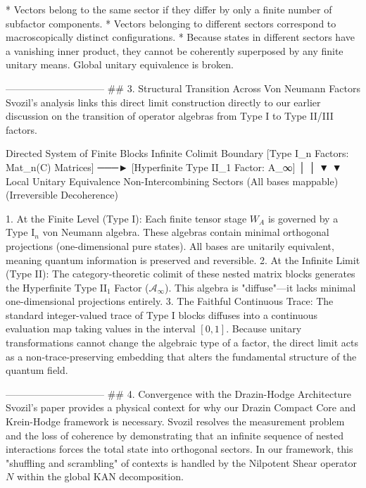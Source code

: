 * Vectors belong to the same sector if they differ by only a finite number of subfactor components.
* Vectors belonging to different sectors correspond to macroscopically distinct configurations.
* Because states in different sectors have a vanishing inner product, they cannot be coherently superposed by any finite unitary means. Global unitary equivalence is broken.

------------------------------
## 3. Structural Transition Across Von Neumann Factors
Svozil's analysis links this direct limit construction directly to our earlier discussion on the transition of operator algebras from Type I to Type II/III factors.

      Directed System of Finite Blocks               Infinite Colimit Boundary
 [Type I_n Factors: Mat_n(C) Matrices]  ───►  [Hyperfinite Type II_1 Factor: A_∞]
                    │                                            │
                    ▼                                            ▼
       Local Unitary Equivalence                    Non-Intercombining Sectors
          (All bases mappable)                       (Irreversible Decoherence)


   1. At the Finite Level (Type I): Each finite tensor stage $W_A$ is governed by a Type $\text{I}_n$ von Neumann algebra. These algebras contain minimal orthogonal projections (one-dimensional pure states). All bases are unitarily equivalent, meaning quantum information is preserved and reversible.
   2. At the Infinite Limit (Type II): The category-theoretic colimit of these nested matrix blocks generates the Hyperfinite Type $\text{II}_1$ Factor ($\mathcal{A}_\infty$). This algebra is "diffuse"—it lacks minimal one-dimensional projections entirely.
   3. The Faithful Continuous Trace: The standard integer-valued trace of Type I blocks diffuses into a continuous evaluation map taking values in the interval $[0,1]$. Because unitary transformations cannot change the algebraic type of a factor, the direct limit acts as a non-trace-preserving embedding that alters the fundamental structure of the quantum field.

------------------------------
## 4. Convergence with the Drazin-Hodge Architecture
Svozil’s paper provides a physical context for why our Drazin Compact Core and Krein-Hodge framework is necessary.
Svozil resolves the measurement problem and the loss of coherence by demonstrating that an infinite sequence of nested interactions forces the total state into orthogonal sectors. In our framework, this "shuffling and scrambling" of contexts is handled by the Nilpotent Shear operator $N$ within the global KAN decomposition.

